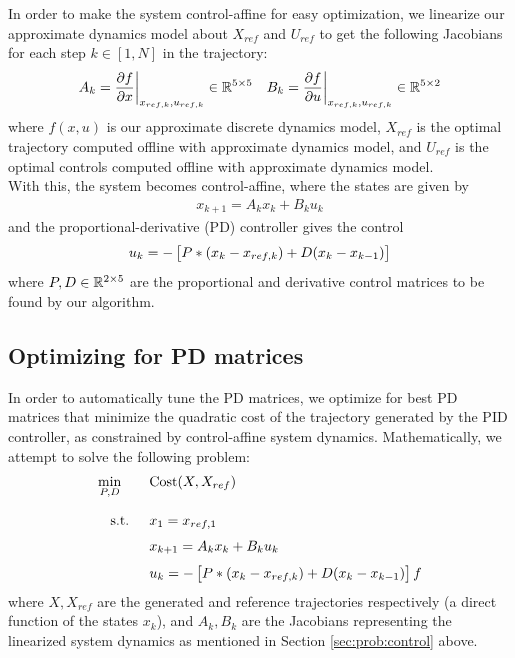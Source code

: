 \documentclass[11pt]{article}
\begin{document}
    In order to make the system control-affine for easy optimization, we linearize our approximate dynamics model about $X_{ref}$ and $U_{ref}$ to get the following Jacobians for each step $k \in [1, N] $ in the trajectory:
    \begin{align*}
        A_k = \frac{\partial f}{\partial x}\bigg|_{x_{ref,k},u_{ref,k}} \in \mathbb R^{5\times 5}&& 
        B_k = \frac{\partial f}{\partial u}\bigg|_{x_{ref,k},u_{ref,k}}  \in \mathbb R^{5\times 2}
    \end{align*}
    where $f(x,u)$ is our approximate discrete dynamics model, $X_{ref}$ is the optimal trajectory computed offline with approximate dynamics model, and $U_{ref}$ is the optimal controls computed offline with approximate dynamics model. \\
    With this, the system becomes control-affine, where the states are given by
    \begin{align*}
        x_{k+1} = A_k x_k + B_k u_k
    \end{align*}
    and the proportional-derivative (PD) controller gives the control
    \begin{align*}
        u_k = - \left[\strut P * \left(x_{k} - x_{ref,k}\right) + D (x_k - x_{k-1}) \strut \right]
    \end{align*}
    where $P,D \in \mathbb R^{2\times 5}$ are the proportional and derivative control matrices to be found by our algorithm.
    
    \pagebreak
    
    \subsection{Optimizing for PD matrices} \label{sec:prob:pdoptim}
    In order to automatically tune the PD matrices, we optimize for best PD matrices that minimize the quadratic cost of the trajectory generated by the PID controller, as constrained by control-affine system dynamics. Mathematically, we attempt to solve the following problem:
    \begin{align*}
        \min_{P,D}\qquad & \mathrm{Cost}(X, X_{ref}) \fracln
        \st \quad & x_1 = x_{ref, 1} \vecln
        &         x_{k+1} = A_k x_k + B_k u_k \vecln
        &         u_k = - \left[\strut P * \left(x_{k} - x_{ref,k}\right) + D (x_k - x_{k-1}) \strut \right]
f    \end{align*}
    where $X, X_{ref}$ are the generated and reference trajectories respectively (a direct function of the states $x_k$), and $A_k, B_k$ are the Jacobians representing the linearized system dynamics as mentioned in Section \ref{sec:prob:control} above.
    
\end{document}
